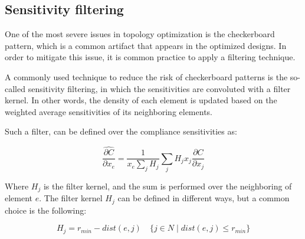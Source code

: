 \subsection{Sensitivity filtering}
\label{subsec:sensitivity_filtering}

One of the most severe issues in topology optimization is the checkerboard pattern, which is a common artifact that appears in the optimized designs.
In order to mitigate this issue, it is common practice to apply a filtering technique.

A commonly used technique to reduce the risk of checkerboard patterns is the so-called sensitivity filtering, in which the sensitivities are convoluted with a filter kernel.
In other words, the density of each element is updated based on the weighted average sensitivities of its neighboring elements.

Such a filter, can be defined over the compliance sensitivities as:

\begin{equation}
    \frac{\hat{\partial C}}{\partial x_e} = \frac{1}{x_e \sum_{j} H_{j}} \sum_{j} H_{j} x_j \frac{\partial C}{\partial x_j}
    \label{eq:sensitivity_filtering}
\end{equation}

Where $H_{j}$ is the filter kernel, and the sum is performed over the neighboring of element $e$.
The filter kernel $H_{j}$ can be defined in different ways, but a common choice is the following:

\begin{equation}
    H_{j} = r_{min} - dist(e, j) \quad \{j \in N \mid dist(e, j) \leq r_{min}\}
    \label{eq:filter_kernel}
\end{equation}
